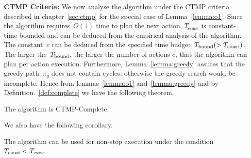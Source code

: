 \documentclass[a4paper]{report}
\begin{document}
\textbf{CTMP Criteria:} We now analyse the algorithm under the CTMP criteria described in chapter~\ref{sec:ctmp} for the special case of Lemma~\ref{lemma:o1}. Since the algorithm requires~$O(1)$ time to plan the next action, $T_\textrm{const}$ is constant-time bounded and can be deduced from the empirical analysis of the algorithm.
%
The constant~$c$ can be deduced from the specified time budget~$T_{\textrm{bound}} (> T_\textrm{const})$. The larger the~$T_{\textrm{bound}}$, the larger the number of actions $c$, that the algorithm can plan per action execution.
%
Furthermore, Lemma~\ref{lemma:greedy} assures that the greedy path~$\pi_g$ does not contain cycles, otherwise the greedy search would be incomplete. Hence from lemmas~\ref{lemma:o1} and~\ref{lemma:greedy} and by Definition.~\ref{def:complete} we have the following theorem.

\vspace{2mm}
\begin{theorem}
	The algorithm is CTMP-Complete.
\end{theorem}

We also have the following corollary.

\vspace{2mm}
\begin{cor}
	The algorithm can be used for non-stop execution under the condition~$T_{\textrm{const}} < T_{\textrm{exec}}$
\end{cor}
%
%
%
\end{document}
